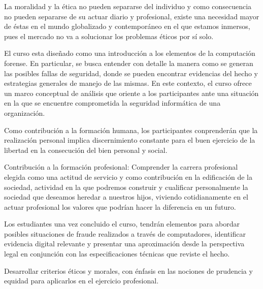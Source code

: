 \begin{syllabus}


\begin{justification}
La moralidad y la ética no pueden separarse del individuo y como consecuencia
no pueden separarse de su actuar diario y profesional, existe una necesidad 
mayor de éstas en el mundo globalizado y contemporáneo en el que estamos inmersos, 
pues el mercado no va a solucionar los problemas éticos por sí solo.

El curso esta diseñado como una introducción a los elementos de la computación forense. 
En particular, se busca entender con detalle la manera como se generan las posibles 
fallas de seguridad, donde se pueden encontrar evidencias del hecho y estrategias 
generales de manejo de las mismas. En este contexto, el curso ofrece un marco 
conceptual de análisis que oriente a los participantes ante una situación en la 
que se encuentre comprometida la seguridad informática de una organización.

Como contribución a la formación humana, los participantes conprenderán que la 
realización personal implica discernimiento constante para el buen ejercicio 
de la libertad en la consecución del bien personal y social.

Contribución a la formación profesional: Comprender la carrera profesional 
elegida como una actitud de servicio y como contribución en la edificación 
de la sociedad, actividad en la que podremos construir y cualificar personalmente 
la sociedad que deseamos heredar a nuestros hijos, viviendo cotidianamente 
en el actuar profesional los valores que podrían hacer la diferencia en un futuro.

Los estudiantes una vez concluido el curso, tendrán elementos para abordar 
posibles situaciones de fraude realizados a través de computadores, 
identificar evidencia digital relevante y presentar una aproximación desde la 
perspectiva legal en conjunción con las especificaciones técnicas que reviste 
el hecho.
\end{justification}

\begin{goals}
\item Desarrollar criterios éticos y morales, con énfasis en las nociones de prudencia y equidad para aplicarlos en el ejercicio profesional.
\end{goals}

\begin{outcomes}
\end{outcomes}


\end{syllabus}
